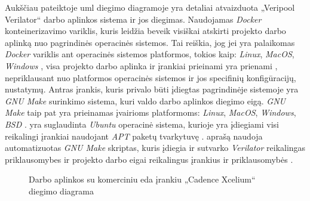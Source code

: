Aukščiau pateiktoje \gls{uml} diegimo diagramoje \pav{\ref{fig:uml_deplayement_verilator}} yra detaliai atvaizduota „Veripool Verilator“ darbo aplinkos sistema ir jos diegimas. Naudojamas \textit{Docker} konteinerizavimo variklis, kuris leidžia beveik visiškai atskirti projekto darbo aplinką nuo pagrindinės  operacinės sistemos. Tai reiškia, jog jei yra palaikomas \textit{Docker} variklis ant operacinės sistemos platformos, tokios kaip: \textit{Linux}, \textit{MacOS}, \textit{Windows} \cite{docker_docs}, visa projekto darbo aplinka ir įrankiai prieinami yra prienami , nepriklausant nuo platformos operacinės sistemos ir jos specifinių konfigūracijų, nustatymų. Antras įrankis, kuris privalo būti įdiegtas pagrindinėje sistemoje yra \textit{GNU Make} surinkimo sistema, kuri valdo darbo aplinkos diegimo eigą. \textit{GNU Make} taip pat yra prieinamas įvairioms platformoms: \textit{Linux}, \textit{MacOS}, \textit{Windows}, \textit{BSD} \cite{gnu_make_supported_platforms}.  yra suglaudinta  \textit{Ubuntu} operacinė sistema, kurioje yra įdiegiami visi reikalingi įrankiai naudojant \textit{APT} paketų tvarkytuvę .  aprašą naudoja automatizuotas \textit{GNU Make} skriptas, kuris įdiegia ir sutvarko \textit{Verilator}  reikalingas priklausomybes \lent{\ref{tab:docker_dependencies_verilator}} ir projekto darbo eigai reikalingus įrankius ir priklausomybės \lent{\ref{tab:docker_dependencies}}.

\begin{figure}[H]
	
	\caption{Darbo aplinkos su komerciniu \gls{eda} įrankiu „Cadence Xcelium“ diegimo diagrama}
	\label{fig:uml_deplayement_xcelium}
\end{figure}

